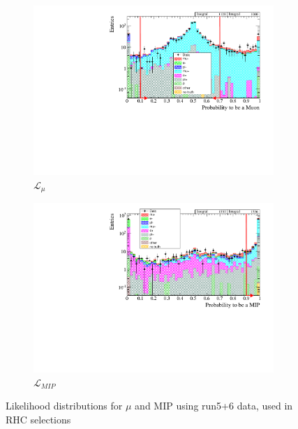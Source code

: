 \begin{figure}[h]
	\begin{subfigure}[t]{0.49\textwidth}
		\includegraphics[width=\textwidth]{figures/numu/Cuts/numubar/likemu_numubar}
		\caption{$\mathcal{L}_\mu$}
	\end{subfigure}
	\begin{subfigure}[t]{0.49\textwidth}
		\includegraphics[width=\textwidth]{figures/numu/Cuts/numubar/likemip_numubar}
		\caption{$\mathcal{L}_{MIP}$}
	\end{subfigure}
	\caption{Likelihood distributions for $\mu$ and MIP using run5+6 \numubar data, used in \numubar RHC selections}
	\label{fig:numubar_likelihood}
\end{figure}

